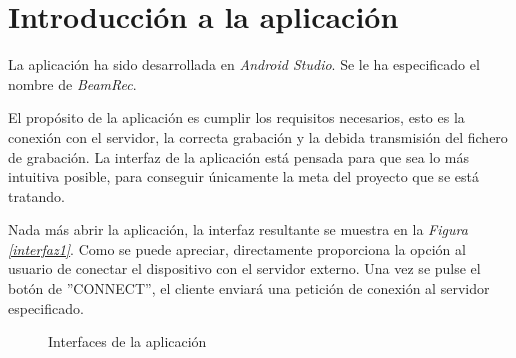 \documentclass[a4paper,11pt]{book}
\begin{document}
	\section{Introducción a la aplicación}
	La aplicación ha sido desarrollada en \textit{Android Studio}. Se le ha especificado el nombre de \textit{BeamRec}.
	
	El propósito de la aplicación es cumplir los requisitos necesarios, esto es la conexión con el servidor, la correcta grabación y la debida transmisión del fichero de grabación. La interfaz de la aplicación está pensada para que sea lo más intuitiva posible, para conseguir únicamente la meta del proyecto que se está tratando.
	
	Nada más abrir la aplicación, la interfaz resultante se muestra en la \textit{Figura \ref{interfaz1}}. Como se puede apreciar, directamente proporciona la opción al usuario de conectar el dispositivo con el servidor externo. Una vez se pulse el botón de ''CONNECT'', el cliente enviará una petición de conexión al servidor especificado.

\begin{figure}
 \centering
 \caption{Interfaces de la aplicación}
\end{figure}
\end{document}
